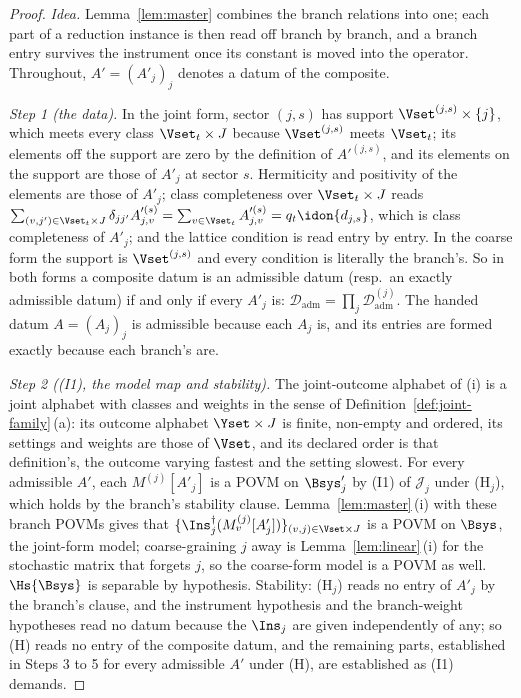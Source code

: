 \begin{proof}
\emph{Idea.} Lemma~\ref{lem:master} combines the branch relations into one;
each part of a reduction instance is then read off branch by branch, and a
branch entry survives the instrument once its constant is moved into the
operator. Throughout, $A'=(A'_j)_j$ denotes a datum of the composite.

\emph{Step 1 (the data).} In the joint form, sector $(j,s)$ has support
$\Vset^{(j,s)}\times\{j\}$, which meets every class $\Vset_t\times J$ because
$\Vset^{(j,s)}$ meets $\Vset_t$; its elements off the support are zero by the
definition of $A'^{(j,s)}$, and its elements on the support are those of
$A'_j$ at sector $s$. Hermiticity and positivity of the elements are those of
$A'_j$; class completeness over $\Vset_t\times J$ reads
$\sum_{(v,j')\in\Vset_t\times J}\delta_{jj'}A'^{(s)}_{j,v}
=\sum_{v\in\Vset_t}A'^{(s)}_{j,v}=q_t\idon{d_{j,s}}$, which is class
completeness of $A'_j$; and the lattice condition is read entry by entry.
In the coarse form the support is $\Vset^{(j,s)}$ and every condition is
literally the branch's. So in both forms a composite datum is an admissible
datum (resp.\ an exactly admissible datum) if and only if every $A'_j$ is:
$\mathcal{D}_{\mathrm{adm}}=\prod_j\mathcal{D}^{(j)}_{\mathrm{adm}}$. The
handed datum $A=(A_j)_j$ is admissible because each $A_j$ is, and its entries
are formed exactly because each branch's are.

\emph{Step 2 ((I1), the model map and stability).} The joint-outcome
alphabet of (i) is a joint alphabet with classes and weights in the sense of
Definition~\ref{def:joint-family}\,(a): its outcome alphabet $\Yset\times J$
is finite, non-empty and ordered, its settings and weights are those of
$\Vset$, and its declared order is that definition's, the outcome varying
fastest and the setting slowest. For every admissible $A'$,
each $M^{(j)}[A'_j]$ is a POVM on $\Bsys'_j$ by (I1) of $\mathcal{J}_j$ under
(H$_j$), which holds by the branch's stability clause. Lemma~\ref{lem:master}\,(i)
with these branch POVMs gives that
$\{\Ins_j^{\dagger}(M^{(j)}_v[A'_j])\}_{(v,j)\in\Vset\times J}$ is a POVM on
$\Bsys$, the joint-form model; coarse-graining $j$ away is
Lemma~\ref{lem:linear}\,(i) for the stochastic matrix that forgets $j$, so
the coarse-form model is a POVM as well. $\Hs{\Bsys}$ is separable by
hypothesis. Stability: (H$_j$) reads no entry of $A'_j$ by the branch's
clause, and the instrument hypothesis and the branch-weight hypotheses read
no datum because the $\Ins_j$ are given independently of any; so (H) reads
no entry of the composite datum,
and the remaining parts, established in Steps 3 to 5 for every admissible $A'$ under
(H), are established as (I1) demands.


\end{proof}
